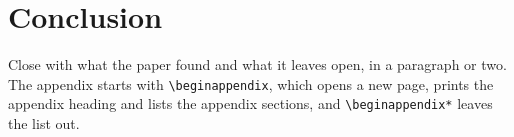 \section{Conclusion}
\label{sec:conclusion}

Close with what the paper found and what it leaves open, in a paragraph or two.
The appendix starts with \verb|\beginappendix|, which opens a new page, prints the appendix heading and lists the appendix sections, and \verb|\beginappendix*| leaves the list out.
